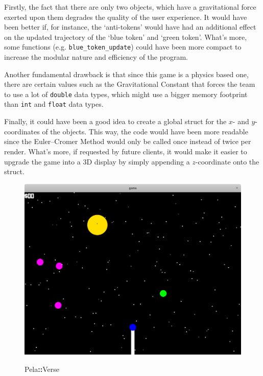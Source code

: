 \documentclass[11pt]{article}
\newcommand{\pelahverse}{Pela\hspace*{1pt}\textbf{::}Verse}
\begin{document}
Firstly, the fact that there are only two objects, which have a gravitational force exerted upon them degrades the quality of the user experience. It would have been better if, for instance, the `anti-tokens' would have had an additional effect on the updated trajectory of the `blue token' and `green token'. What's more, some functions (e.g. \texttt{blue\_token\_update}) could have been more compact to increase the modular nature and efficiency of the program. 

Another fundamental drawback is that since this game is a physics based one, there are certain values such as the Gravitational Constant that forces the team to use a lot of \texttt{double} data types, which might use a bigger memory footprint than \texttt{int} and \texttt{float} data types.

Finally, it could have been a good idea to create a global struct for the $x$-  and $y$-coordinates of the objects. This way, the code would have been more readable since the Euler--Cromer Method would only be called once instead of twice per render. What's more, if requested by future clients, it would make it easier to upgrade the game into a 3D display by simply appending a $z$-coordinate onto the struct.

\vfill
\begin{figure}[h!]
    \centering
    \includegraphics[width=.6\textwidth]{game-screenshot.png}\\[1em]
    \caption*{\hspace*{4pt}\Large\pelahverse}
\end{figure}
\vfill

\clearpage
\appendix






\end{document}
